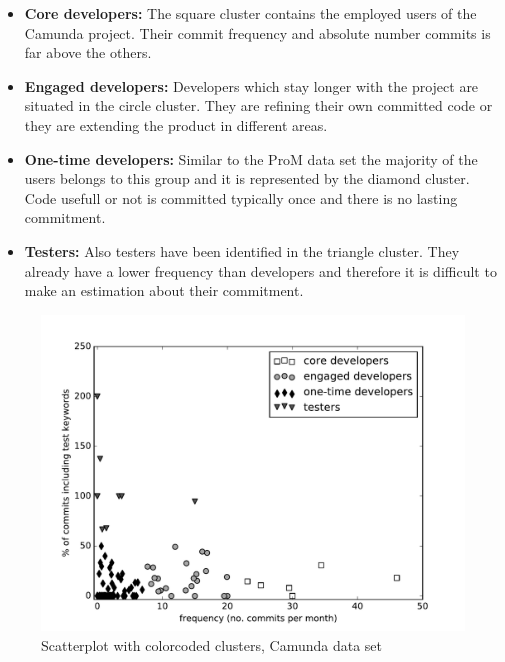 \begin{itemize}

\item \textbf{Core developers:} The square cluster contains the employed users of the Camunda project. Their commit frequency and absolute number commits is far above the others.

\item \textbf{Engaged developers:} Developers which stay longer with the project are situated in the circle cluster. They are refining their own committed code or they are extending the product in different areas.

\item \textbf{One-time developers:} Similar to the ProM data set the majority of the users belongs to this group and it is represented by the diamond cluster. Code usefull or not is committed typically once and there is no lasting commitment.

\item \textbf{Testers:} Also testers have been identified in the triangle cluster. They already have a lower frequency than developers and therefore it is difficult to make an estimation about their commitment.

\end{itemize}

\begin{figure}
   \includegraphics[width=\columnwidth]{ResourceClassification/figures/camunda4k_black.pdf}
   \caption{Scatterplot with colorcoded clusters, Camunda data set}
   \label{fig:camunda4k}
\end{figure}

